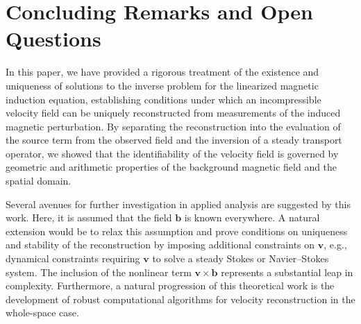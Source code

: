 \documentclass[12pt]{article}
\newtheorem{remark}{Remark}
\begin{document}
			
		
		

		\section{Concluding Remarks and Open Questions}

In this paper, we have provided a rigorous treatment of the existence and uniqueness of solutions to the inverse problem for the linearized magnetic induction equation, establishing conditions under which an incompressible velocity field can be uniquely reconstructed from measurements of the induced magnetic perturbation. By separating the reconstruction into the evaluation of the source term from the observed field and the inversion of a steady transport operator, we showed that the identifiability of the velocity field is governed by geometric and arithmetic properties of the background magnetic field and the spatial domain. 

Several avenues for further investigation in applied analysis are suggested by this work. Here, it is assumed that the field $\boldsymbol{b}$ is known everywhere. A natural extension would be to relax this assumption and prove conditions on uniqueness and stability of the reconstruction by imposing additional constraints on $\boldsymbol{v}$, e.g., dynamical constraints requiring $\boldsymbol{v}$ to solve a steady Stokes or Navier--Stokes system. The inclusion of the nonlinear term $\boldsymbol{v} \times \boldsymbol{b}$ represents a substantial leap in complexity. Furthermore, a natural progression of this theoretical work is the development of robust computational algorithms for velocity reconstruction in the whole-space case.
		
\end{document}
